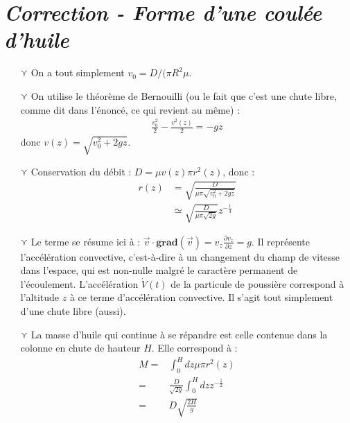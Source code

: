 \documentclass{report}
\begin{document}
\newpage

\section*{\textit{Correction - Forme d'une coulée d'huile}}

\begin{itemize}

	\item[$\curlyvee$] On a tout simplement $v_0=D/(\pi R^2\mu$.
	
	\item[$\curlyvee$] On utilise le théorème de Bernouilli (ou le fait que c'est une chute libre, comme dit dans l'énoncé, ce qui revient au même) :
	\begin{align*}
	\frac{v_0^2}{2} - \frac{v^2(z)}{2} = -gz
	\end{align*}
	donc $v(z)=\sqrt{v_0^2+2gz}$.
	
	\item[$\curlyvee$] Conservation du débit : $D=\mu v(z)\pi r^2(z)$, donc :
	\begin{align*}
		r(z)&=\sqrt{\frac{D}{\mu \pi \sqrt{v_0^2+2gz}}}\\
		&\simeq\sqrt{\frac{D}{\mu\pi\sqrt{2g}}}z^{-\frac{1}{4}}
	\end{align*}
	
	\item[$\curlyvee$] Le terme se résume ici à : $\vec{v}\cdot\mathbf{grad}(\vec{v})=v_z\frac{\partial v_z}{\partial z}=g$. Il représente l'accélération convective, c'est-à-dire à un changement du champ de vitesse dans l'espace, qui est non-nulle malgré le caractère permanent de l'écoulement. L'accélération $\dot{V}(t)$ de la particule de poussière correspond à l'altitude $z$ à ce terme d'accélération convective. Il s'agit tout simplement d'une chute libre (aussi).
	
	\item[$\curlyvee$] La masse d'huile qui continue à se répandre est celle contenue dans la colonne en chute de hauteur $H$. Elle correspond à :
	\begin{align*}
		M=&\int_0^Hdz\mu \pi r^2(z) \\
		=&\frac{D}{\sqrt{2g}}\int_0^Hdzz^{-\frac{1}{2}}\\
		=&D\sqrt{\frac{2H}{g}}
	\end{align*}

\end{itemize}

\newpage
\end{document}
